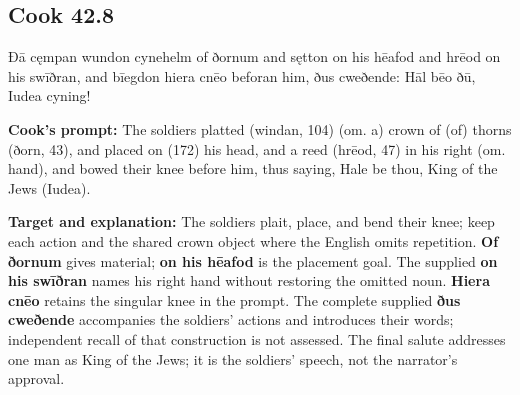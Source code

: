 \par\begin{minipage}{\linewidth}\raggedright
\subsection*{Cook 42.8}

Ðā cęmpan wundon cynehelm of ðornum and sętton on his hēafod and hrēod on his swīðran, and bīegdon hiera cnēo beforan him, ðus cweðende: Hāl bēo ðū, Iudea cyning!

\textbf{Cook's prompt:} The soldiers platted (windan, 104) (om. a) crown of (of) thorns (ðorn, 43), and placed on (172) his head, and a reed (hrēod, 47) in his right (om. hand), and bowed their knee before him, thus saying, Hale be thou, King of the Jews (Iudea).

\textbf{Target and explanation:} The soldiers plait, place, and bend their knee; keep each action and the shared crown object where the English omits repetition. \textbf{Of ðornum} gives material; \textbf{on his hēafod} is the placement goal. The supplied \textbf{on his swīðran} names his right hand without restoring the omitted noun. \textbf{Hiera cnēo} retains the singular knee in the prompt. The complete supplied \textbf{ðus cweðende} accompanies the soldiers' actions and introduces their words; independent recall of that construction is not assessed. The final salute addresses one man as King of the Jews; it is the soldiers' speech, not the narrator's approval.

\end{minipage}\par\addvspace{4pt}

